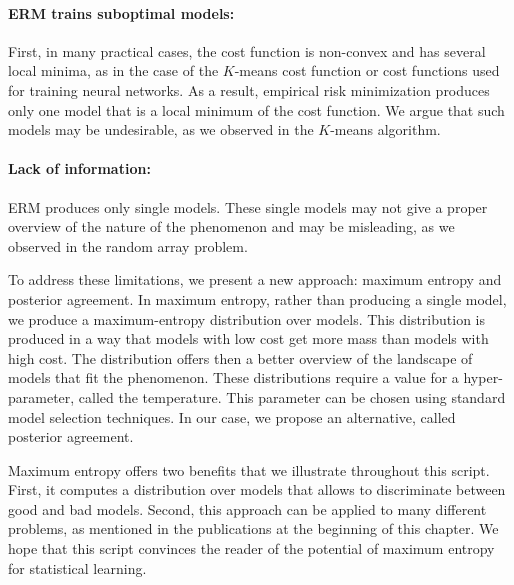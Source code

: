 \paragraph{ERM trains suboptimal models:} First, in many practical cases, the cost function is non-convex and has several local minima, as in the case of the $K$-means cost function or cost functions used for training neural networks. As a result, empirical risk minimization produces only one model that is a local minimum of the cost function. We argue that such models may be undesirable, as we observed in the $K$-means algorithm. 

\paragraph{Lack of information:} ERM produces only single models. These single models may not give a proper overview of the nature of the phenomenon and may be misleading, as we observed in the random array problem.

\vspace{15pt}

To address these limitations, we present a new approach: maximum entropy and posterior agreement. In maximum entropy, rather than producing a single model, we produce a maximum-entropy distribution over models. This distribution is produced in a way that models with low cost get more mass than models with high cost. The distribution offers then a better overview of the landscape of models that fit the phenomenon. These distributions require a value for a hyper-parameter, called the temperature. This parameter can be chosen using standard model selection techniques. In our case, we propose an alternative, called posterior agreement.

Maximum entropy offers two benefits that we illustrate throughout this script. First, it computes a distribution over models that allows to discriminate between good and bad models. Second, this approach can be applied to many different problems, as mentioned in the publications at the beginning of this chapter. We hope that this script convinces the reader of the potential of maximum entropy for statistical learning.